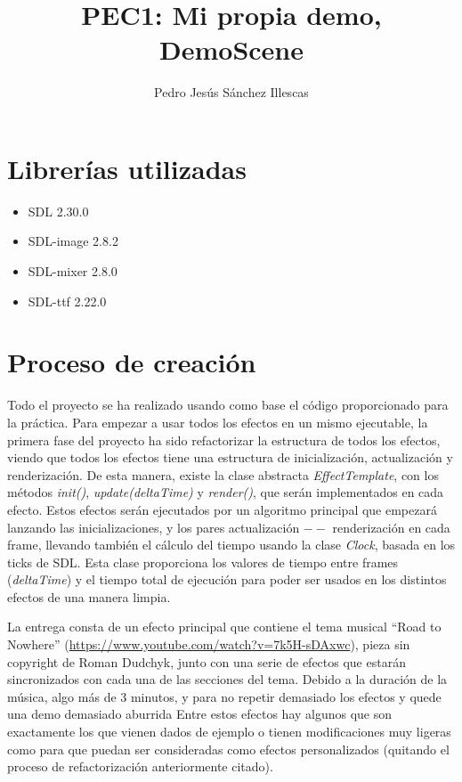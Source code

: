 \documentclass[12pt]{article}%
\begin{document}
\sloppy

\title{PEC1: Mi propia demo, DemoScene}
\author{Pedro Jesús Sánchez Illescas}

\maketitle

\newpage

\tableofcontents

\newpage

\section{Librerías utilizadas}
\begin{itemize}
	\item SDL 2.30.0
	\item SDL-image 2.8.2
	\item SDL-mixer 2.8.0
	\item SDL-ttf 2.22.0
\end{itemize}

\section{Proceso de creación}
	Todo el proyecto se ha realizado usando como base el código proporcionado para la práctica. Para empezar a usar todos los efectos en un mismo ejecutable, la primera fase del proyecto ha sido refactorizar la estructura de todos los efectos, viendo que todos los efectos tiene una estructura de inicialización, actualización y renderización. De esta manera, existe la clase abstracta \textit{EffectTemplate}, con los métodos \textit{init()}, \textit{update(deltaTime)} y \textit{render()}, que serán implementados en cada efecto. Estos efectos serán ejecutados por un algoritmo principal que empezará lanzando las inicializaciones, y los pares actualización $--$ renderización en cada frame, llevando también el cálculo del tiempo usando la clase \textit{Clock}, basada en los ticks de SDL. Esta clase proporciona los valores de tiempo entre frames (\textit{deltaTime}) y el tiempo total de ejecución para poder ser usados en los distintos efectos de una manera limpia.
	
	La entrega consta de un efecto principal que contiene el tema musical ``Road to Nowhere'' (\url{https://www.youtube.com/watch?v=7k5H-sDAxwc}), pieza sin copyright de Roman Dudchyk, junto con una serie de efectos que estarán sincronizados con cada una de las secciones del tema. Debido a la duración de la música, algo más de $3$ minutos, y para no repetir demasiado los efectos y quede una demo demasiado aburrida Entre estos efectos hay algunos que son exactamente los que vienen dados de ejemplo o tienen modificaciones muy ligeras como para que puedan ser consideradas como efectos personalizados (quitando el proceso de refactorización anteriormente citado).
	
\end{document}
